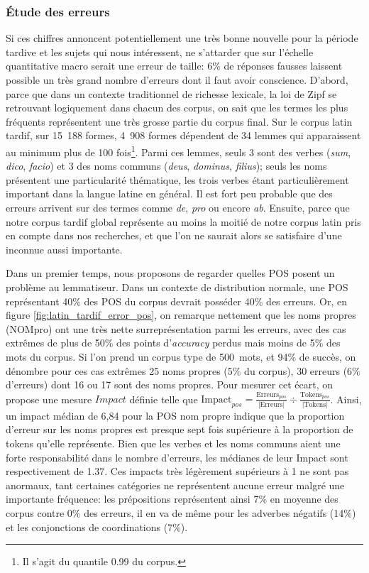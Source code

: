 \subsubsection{Étude des erreurs}

Si ces chiffres annoncent potentiellement une très bonne nouvelle pour la période tardive et les sujets qui nous intéressent, ne s'attarder que sur l'échelle quantitative macro serait une erreur de taille: 6\% de réponses fausses laissent possible un très grand nombre d'erreurs dont il faut avoir conscience. D'abord, parce que dans un contexte traditionnel de richesse lexicale, la loi de Zipf se retrouvant logiquement dans chacun des corpus, on sait que les termes les plus fréquents représentent une très grosse partie du corpus final. Sur le corpus latin tardif, sur 15~188 formes, 4~908 formes dépendent de 34 lemmes qui apparaissent au minimum plus de 100 fois\footnote{Il s'agit du quantile 0.99 du corpus.}. Parmi ces lemmes, seuls 3 sont des verbes (\textit{sum}, \textit{dico}, \textit{facio}) et 3 des noms communs (\textit{deus}, \textit{dominus}, \textit{filius}); seuls les noms présentent une particularité thématique, les trois verbes étant particulièrement important dans la langue latine en général. Il est fort peu probable que des erreurs arrivent sur des termes comme \textit{de}, \textit{pro} ou encore \textit{ab}. Ensuite, parce que notre corpus tardif global représente au moins la moitié de notre corpus latin pris en compte dans nos recherches, et que l'on ne saurait alors se satisfaire d'une inconnue aussi importante.

Dans un premier temps, nous proposons de regarder quelles POS posent un problème au lemmatiseur. Dans un contexte de distribution normale, une POS représentant 40\% des POS du corpus devrait posséder 40\% des erreurs. Or, en figure \ref{fig:latin_tardif_error_pos}, on remarque nettement que les noms propres (NOMpro) ont une très nette surreprésentation parmi les erreurs, avec des cas extrêmes de plus de 50\% des points d'\textit{accuracy} perdus mais moins de 5\% des mots du corpus. Si l'on prend un corpus type de 500~mots, et 94\% de succès, on dénombre pour ces cas extrêmes 25 noms propres (5\% du corpus), 30 erreurs (6\% d'erreurs) dont 16 ou 17 sont des noms propres. Pour mesurer cet écart, on propose une mesure $Impact$ définie telle que $\text{Impact}_{pos} = \frac{\text{Erreurs}_{pos}}{\left | \text{Erreurs} \right |} \div \frac{\text{Tokens}_{pos}}{\left | \text{Tokens} \right |}$. Ainsi, un impact médian de 6,84 pour la POS nom propre indique que la proportion d'erreur sur les noms propres est presque sept fois supérieure à la proportion de tokens qu'elle représente. Bien que les verbes et les noms communs aient une forte responsabilité dans le nombre d'erreurs, les médianes de leur Impact sont respectivement de 1.37. Ces impacts très légèrement supérieurs à 1 ne sont pas anormaux, tant certaines catégories ne représentent aucune erreur malgré une importante fréquence: les prépositions représentent ainsi  7\% en moyenne des corpus contre 0\% des erreurs, il en va de même pour les adverbes négatifs (14\%) et les conjonctions de coordinations (7\%).

